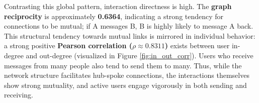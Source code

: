 Contrasting this global pattern, interaction directness is high. The \textbf{graph reciprocity} is approximately \textbf{0.6364}, indicating a strong tendency for connections to be mutual; if A messages B, B is highly likely to message A back. This structural tendency towards mutual links is mirrored in individual behavior: a strong positive \textbf{Pearson correlation ($\rho \approx 0.8311$)} exists between user in-degree and out-degree (visualized in Figure \ref{fig:in_out_corr}). Users who receive messages from many people also tend to send them to many. Thus, while the network structure facilitates hub-spoke connections, the interactions themselves show strong mutuality, and active users engage vigorously in both sending and receiving.

\begin{figure}[h!]
    \centering


\end{figure}
